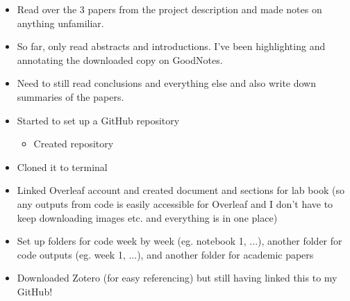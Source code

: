 \begin{itemize}
\item Read over the 3 papers from the project description and made notes on anything unfamiliar.
\end{itemize}
\begin{itemize}
    \item So far, only read abstracts and introductions. I've been highlighting and annotating the downloaded copy on GoodNotes.
    \item Need to still read conclusions and everything else and also write down summaries of the papers.
\end{itemize}
\begin{itemize}
    \item Started to set up a GitHub repository
        \begin{itemize}
            \item Created repository
        \end{itemize}
\end{itemize}
\begin{itemize}
    \begin{itemize}
        \item Cloned it to terminal
    \end{itemize}
\end{itemize}
        \begin{itemize}
            \begin{itemize}
                \item Linked Overleaf account and created document and sections for lab book (so any outputs from code is easily accessible for Overleaf and I don't have to keep downloading images etc. and everything is in one place)
            \end{itemize}
        \end{itemize}
        \begin{itemize}
            \begin{itemize}
                \item Set up folders for code week by week (eg. notebook 1, ...), another folder for code outputs (eg. week 1, ...), and another folder for academic papers
            \end{itemize}
        \end{itemize}
        \begin{itemize}
            \begin{itemize}
                \item Downloaded Zotero (for easy referencing) but still having linked this to my GitHub!
            \end{itemize}
        \end{itemize}

